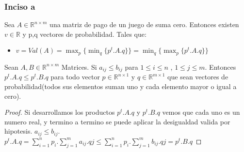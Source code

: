 \subsubsection{Inciso a}
\begin{theorem}[Minimax]
\label{minimax-teo}
	Sea $A \in \mathbb{R}^{n \times m}$ una matriz de pago de un juego de suma cero. Entonces existen $v \in \mathbb{R} $ y p,q vectores de probabilidad. Tales que:
	\begin{itemize}
		\item $v = Val(A) = \displaystyle\max_{p} \{    \displaystyle\min_{q} \{  p^t . A . q \}    \} = \displaystyle\min_{q} \{    \displaystyle\max_{p} \{  p^t . A . q \}    \}$ 
	\end{itemize}
\end{theorem}

\begin{lemma}
\label{lema-fg}
	Sean $A, B \in \mathbb{R}^{n \times m}$ Matrices. Si $a_{ij} \leq b_{ij}$ para $1 \leq i \leq n$   ,  $1 \leq j \leq m$. Entonces $p^t . A . q \leq p^t . B . q$ para todo vector $p \in \mathbb{R}^{n \times 1}$ y $q \in \mathbb{R}^{m \times 1}$ que sean vectores de probabilidad(todos sus elementos suman uno y cada elemento mayor o igual a cero).
\end{lemma}
\begin{proof}
	Si desarrollamos los productos $p^t . A . q$ y $p^t . B . q$ vemos que cada uno es un numero real, y termino a termino se puede aplicar la desigualdad valida por hipotesis. $a_{ij} \leq b_{ij}$.\\

	$p^t . A . q = \displaystyle\sum_{i=1}^{n} p_i.\displaystyle\sum_{j=1}^{m} a_{ij}.q{j} \leq 
	\displaystyle\sum_{i=1}^{n} p_i.\displaystyle\sum_{j=1}^{m} b_{ij}.q{j} = p^t . B . q$
\end{proof}


